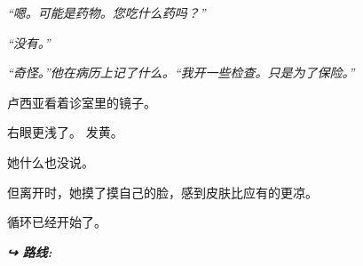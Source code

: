 \noindent \textit{\textquotedblleft{}嗯。可能是药物。您吃什么药吗？\textquotedblright{}}

\noindent \textit{\textquotedblleft{}没有。\textquotedblright{}}

\noindent \textit{\textquotedblleft{}奇怪。\textquotedblright{}他在病历上记了什么。\textquotedblleft{}我开一些检查。只是为了保险。\textquotedblright{}}

\noindent 卢西亚看着诊室里的镜子。

\noindent 右眼更浅了。
\noindent 发黄。

\noindent 她什么也没说。

\noindent 但离开时，她摸了摸自己的脸，感到皮肤比应有的更凉。

\noindent 循环已经开始了。

\vspace{0.5em}
\noindent\textit{\textbf{↪ 路线:}  \rotasep {}}

